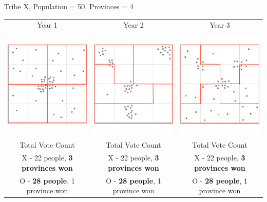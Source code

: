 \begin{center}
Tribe X,
Population = 50,
Provinces = 4

\begin{tabular}{c c c }

Year 1 & Year 2 & Year 3 \\
 \includegraphics[width=2in]{assets/Gerrymandering/Gerry4x4-50-1Solution.pdf} &  \includegraphics[width=2in]{assets/Gerrymandering/Gerry4x4-50-2Solution.pdf} &  \includegraphics[width=2in]{assets/Gerrymandering/Gerry4x4-50-3Solution.pdf}\\
 Total Vote Count &  Total Vote Count &  Total Vote Count\\
 X - 22 people, \textbf{3 provinces won} & X - 22 people, \textbf{3 provinces won} & X  - 22 people, \textbf{3 provinces won}\\
 O - \textbf{28 people}, 1 province won & O - \textbf{28 people}, 1 province won & O - \textbf{28 people}, 1 province won
\end{tabular}
\end{center}

